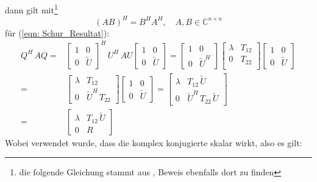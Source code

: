 \documentclass[a4paper,12pt]{report}
\newcommand{\C}{\mathbb C}
\newcommand{\klammer}[1]{\left(#1\right)}
\theoremstyle{plain} %
\theoremstyle{definition} %
\theoremstyle{remark}
\begin{document}
            dann gilt mit\footnote{die folgende Gleichung stammt aus \cite{conjugateTranspose}, Beweis ebenfalls dort zu finden}
            \begin{equation}
                  \label{eqn: Produkt Adjungierter}
                  \klammer{AB}^H = B^HA^H,\quad A,B\in \C^{n\times n}
            \end{equation}
            für (\ref{eqn: Schur_Resultat}):
            $$\begin{aligned}
                  Q^H\,AQ =& \begin{bmatrix}
                        1&0\\
                        0&\widetilde U
                  \end{bmatrix}^H\,U^H\,AU \begin{bmatrix}
                        1&0\\
                        0&\widetilde U
                  \end{bmatrix} = \begin{bmatrix}
                        1&0\\
                        0&\widetilde U^H
                  \end{bmatrix}
                  \begin{bmatrix}
                        \lambda & T_{12} \\
                        0 & T_{22} \\
                  \end{bmatrix}
                  \begin{bmatrix}
                        1&0\\
                        0&\widetilde U
                  \end{bmatrix}\\
                  =& \begin{bmatrix}
                        \lambda&T_{12}\\
                        0&\widetilde U^H\, T_{22}
                  \end{bmatrix}
                  \begin{bmatrix}
                        1&0\\
                        0&\widetilde U
                  \end{bmatrix}
                  = \begin{bmatrix}
                        \lambda&T_{12}\,\widetilde U\\
                        0&\widetilde U^H\, T_{22}\, \widetilde U
                  \end{bmatrix}\\
                  =& \begin{bmatrix}
                        \lambda&T_{12}\,\widetilde U\\
                        0&R
                  \end{bmatrix}
            \end{aligned}$$
            Wobei verwendet wurde, dass die komplex konjugierte skalar wirkt, also es gilt:
           
\end{document}
